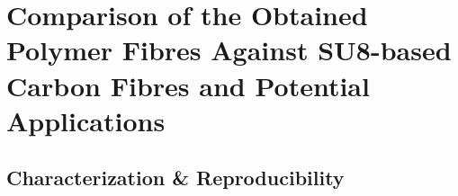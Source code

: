 
\chapter{Comparison of the Obtained Polymer Fibres Against SU8-based Carbon Fibres and Potential Applications} %

\label{Chapter:5}

\section{Characterization \& Reproducibility}


